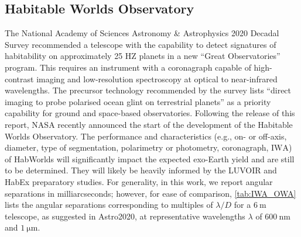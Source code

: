 \documentclass[usenatbib]{mnras}
\newcommand{\IWA}{\ensuremath{\mathrm{IWA}}\xspace}
\newcommand{\OWA}{\ensuremath{\mathrm{OWA}}\xspace}
\newcommand{\HWO}{HabWorlds\xspace}
\newcommand{\Decadal}{Astro2020}  %
\begin{document}
\subsection{Habitable Worlds Observatory}

The National Academy of Sciences Astronomy \& Astrophysics 2020 Decadal Survey \citep[][hereafter \Decadal]{decadal} recommended a telescope with the capability to detect signatures of habitability on approximately 25 HZ planets in a new \enquote{Great Observatories} program.
%
This requires an instrument with a coronagraph capable of high-contrast imaging and low-resolution spectroscopy at optical to near-infrared wavelengths. 
%
The precursor technology recommended by the survey lists \enquote{direct imaging to probe polarised ocean glint on terrestrial planets} as a priority capability \citep[Box E.1 in][]{decadal} for ground and space-based observatories.
%
Following the release of this report, NASA recently announced the start of the development of the Habitable Worlds Observatory.
%
The performance and characteristics (e.g., on- or off-axis, diameter, type of segmentation, polarimetry or photometry, coronagraph, \IWA) of \HWO will significantly impact the expected exo-Earth yield \citep{Stark2019_exoplanetyield} and are still to be determined.
%
They will likely be heavily informed by the LUVOIR \citep{LUVOIR2019} and HabEx \citep{HabEx_2020} preparatory studies.
%
For generality, in this work, we report angular separations in milliarcseconds; however, for ease of comparison, \cref{tab:IWA_OWA} lists the angular separations corresponding to multiples of $\lambda / D$ for a $\qty{6}{\meter}$ telescope, as suggested in \Decadal, at representative wavelengths $\lambda$ of $\qty{600}{\nano\meter}$ and $\qty{1}{\micro\meter}$.

\begin{table}
    \centering
    \caption{
        Inner and Outer Working Angles (\IWA and \OWA{}, respectively) in milliarcseconds (\unit{\mas}) as functions of $\lambda / D$, at wavelengths $\lambda$ of \qty{600}{\nano\meter} and \qty{1}{\micro\meter}, assuming a telescope diameter $D$ of \qty{6}{\meter}.
    }
    \label{tab:IWA_OWA}
    
\end{table}
 
\end{document}
